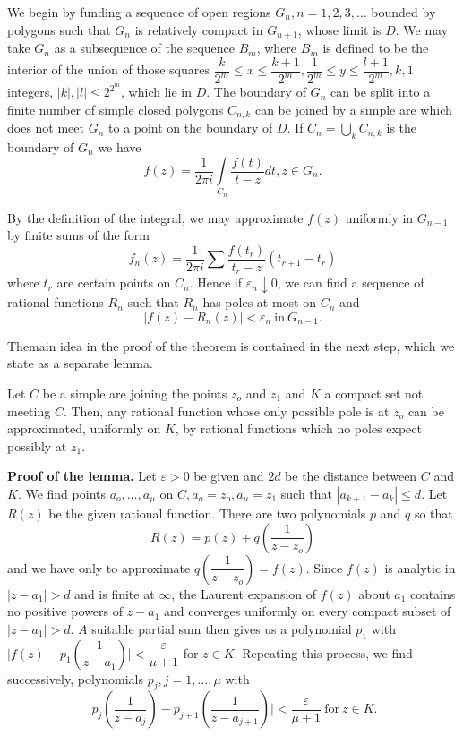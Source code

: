 We begin by funding a sequence of open regions $G_n, n = 1,2,3,
\ldots$ bounded by polygons such that $G_n$ is relatively compact in
$G_{n+1}$,  whose limit is $D$. We may take $G_n$ as a subsequence of
the sequence $B_m$, where $B_m$ is defined to be the interior of the
union  of those squares $\dfrac{k}{2^m} \le x \le \dfrac{k+1}{2^m},
\dfrac{1}{2^m} \le y \le  \dfrac{l+1}{2^m}, k,1$ integers, $|k|, |l|
\le 2^{2^m}$, which lie in $D$. The boundary of $G_n$ can be split
into a finite number of simple closed polygons $C_{n,k}$ can be joined
by a simple are which does not meet $G_n$ to a point on the boundary
of $D$. If $C_n = \bigcup\limits_k C_{n,k}$ is the boundary of $G_n$
we have  
$$
f(z) = \frac{1}{2 \pi i} \int\limits_{C_n} \frac{f(t)}{t-z} dt,  z \in
G_n. 
$$

By the definition of the integral, we may approximate $f(z)$ uniformly
in $G_{n-1}$ by finite sums of the form 
$$
f_n(z) = \frac{1}{2 \pi  i} \sum \frac{f(t_r)}{t_r -z} (t_{r+1}- t_r)
$$
where $t_r$ are certain  points on $C_n$. Hence if  $\varepsilon_n
\downarrow 0$, we can find a sequence of rational functions $R_n$ such
that $R_n$ has poles at most on $C_n$ and  
\begin{equation}
  |f(z) - R_n(z) |  < \varepsilon_n ~\text{in}~ G_{n-1}. \tag{1}
\end{equation}

The\pageoriginale main idea in the proof of the theorem is contained in the next
step, which we state as a separate lemma. 
\begin{lemma*}
  Let $C$ be a simple are joining the points $z_o$ and $z_1$ and $K$
  a compact set not meeting $C$. Then, any  rational function whose only
  possible pole is at $z_o$ can be approximated, uniformly on $K$, by
  rational functions which no poles expect possibly at $z_1$. 
\end{lemma*}

\noindent \textbf{Proof of the lemma. }
  Let $\varepsilon  > 0$  be given and $2d$ be the distance between
  $C$ and $K$. We find points $a_o,  \ldots, a_ \mu$ on $C, a_o= z_o,
  a_\mu = z_1$ such that $|a_{k+1}- a_k | \le d$. Let $R(z)$ be the
  given rational function. There are two polynomials $p$ and $q$ so
  that  
  $$
  R(z) = p(z) +  q \left(\frac{1}{z-z_o}\right)
  $$
  and we have only to approximate $ q \left(\dfrac{1}{z-z_o}\right)=
  f(z)$. Since 
  $f(z)$ is analytic in $|z- a_1 |> d$ and is finite at $\infty$, the
  Laurent expansion of $f(z)$ about $a_1$ contains no positive powers
  of $z- a_1$ and converges uniformly on every compact subset of
  $|z-a_1| > d$. $A$ suitable partial sum then gives us a polynomial
  $p_1$ with $\bigg | f(z) - p_1 \left(\dfrac{1}{z-a_1}\right) \bigg | <
  \dfrac{\varepsilon}{\mu +1}$ for  $z \in K$. Repeating this process,
  we find successively,  polynomials $p_j, j=1, \ldots,  \mu$ with  
  $$
  \bigg| p_j \left(\frac{1}{z-a_j}\right) - p_{j+1}
  \left(\frac{1}{z-a_{j+1}}\right) \bigg | 
  < \frac{\varepsilon}{\mu +1} ~\text{for}~ z \in K. 
  $$

